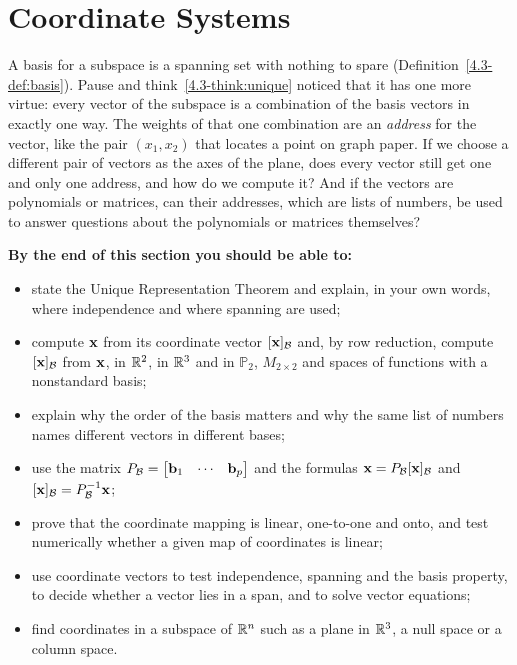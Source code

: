 \documentclass[11pt]{article}
\begin{document}
\section{Coordinate Systems}

\begin{guide}
A basis for a subspace is a spanning set with nothing to spare (Definition~\ref{4.3-def:basis}). Pause and think~\ref{4.3-think:unique} noticed that it has one more virtue: every vector of the subspace is a combination of the basis vectors in exactly one way. The weights of that one combination are an \emph{address} for the vector, like the pair $(x_1,x_2)$ that locates a point on graph paper. If we choose a different pair of vectors as the axes of the plane, does every vector still get one and only one address, and how do we compute it? And if the vectors are polynomials or matrices, can their addresses, which are lists of numbers, be used to answer questions about the polynomials or matrices themselves?
\end{guide}

\textbf{By the end of this section you should be able to:}
\begin{itemize}
  \item state the Unique Representation Theorem and explain, in your own words, where independence and where spanning are used;
  \item compute $\mathbf{x}$ from its coordinate vector $[\mathbf{x}]_{\mathcal{B}}$ and, by row reduction, compute $[\mathbf{x}]_{\mathcal{B}}$ from $\mathbf{x}$, in $\mathbb{R}^2$, in $\mathbb{R}^3$ and in $\mathbb{P}_2$, $M_{2\times2}$ and spaces of functions with a nonstandard basis;
  \item explain why the order of the basis matters and why the same list of numbers names different vectors in different bases;
  \item use the matrix $P_{\mathcal{B}}=\begin{bmatrix}\mathbf{b}_1&\cdots&\mathbf{b}_p\end{bmatrix}$ and the formulas $\mathbf{x}=P_{\mathcal{B}}[\mathbf{x}]_{\mathcal{B}}$ and $[\mathbf{x}]_{\mathcal{B}}=P_{\mathcal{B}}^{-1}\mathbf{x}$;
  \item prove that the coordinate mapping is linear, one-to-one and onto, and test numerically whether a given map of coordinates is linear;
  \item use coordinate vectors to test independence, spanning and the basis property, to decide whether a vector lies in a span, and to solve vector equations;
  \item find coordinates in a subspace of $\mathbb{R}^n$ such as a plane in $\mathbb{R}^3$, a null space or a column space.
\end{itemize}
\end{document}
